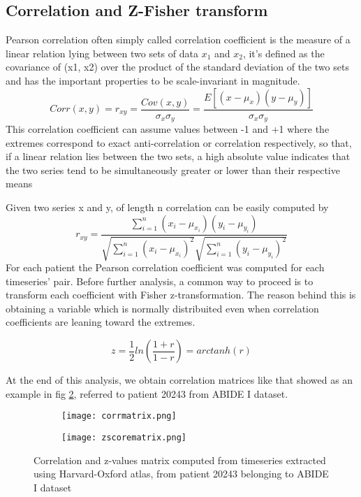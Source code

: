 \documentclass[a4paper,11pt]{article}
\begin{document}
\subsection{Correlation and Z-Fisher transform}

Pearson correlation often simply called correlation coefficient is the measure of a linear relation lying between two sets of data $x_1$ and $x_2$, it's defined as the covariance of (x1, x2) over the product of the standard deviation of the two sets and has the important properties to be scale-invariant in magnitude.
\begin{equation}
Corr(x, y) = r_{xy}=  \frac{Cov\left( x, y\right)}{\sigma_x \sigma_y} = \frac{E\left[ \left( x - \mu_x \right) \left( y - \mu_y \right)\right]}{\sigma_{x} \sigma_{y}}
\end{equation}
This correlation coefficient can assume values between -1 and +1 where the extremes correspond to exact anti-correlation or correlation respectively, so that, if a linear relation lies between the two sets, a high absolute value indicates that the two series tend to be simultaneously greater or lower than their respective means

Given two series x and y, of length n correlation can be easily computed by
\begin{equation}
r_{xy} = \frac{\sum_{i = 1}^n \left( x_i - \mu_{x_i}\right)\left( y_i - \mu_{y_i}\right)}{\sqrt{\sum_{i = 1}^n \left( x_i -\mu_{x_i}\right)^2}\sqrt{\sum_{i = 1}^n \left( y_i -\mu_{y_i}\right)^2}}
\end{equation}
For each patient the Pearson correlation coefficient was computed for each timeseries' pair. Before further analysis, a common way to proceed is to transform each coefficient with Fisher z-transformation. The reason behind this is obtaining a variable which is normally distribuited even when correlation coefficients are leaning toward the extremes.

\begin{equation}
z = \frac{1}{2}ln\left(\frac{1+r}{1-r}\right) = arctanh(r)
\end{equation}

At the end of this analysis, we obtain correlation matrices like that showed as an example in fig \ref{fig:corrmatrices}, referred to patient 20243 from ABIDE I dataset.
\begin{figure}
\begin{subfigure}{0.5\textwidth}
\texttt{[image: corrmatrix.png]}
\caption{}
\label{ref:corrmatrix}
\end{subfigure}
\begin{subfigure}{0.5\textwidth}
\texttt{[image: zscorematrix.png]}
\end{subfigure}
\caption{Correlation and z-values matrix computed from timeseries extracted using Harvard-Oxford atlas, from patient 20243 belonging to ABIDE I dataset}
\label{fig:corrmatrices}
\end{figure}
\end{document}

